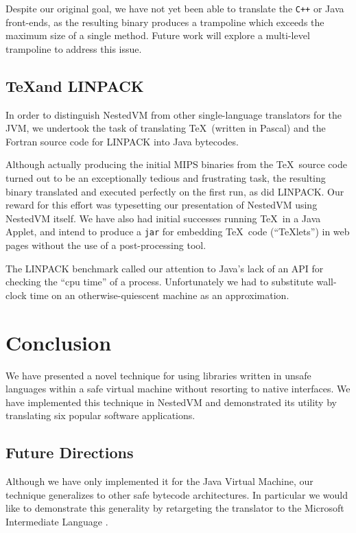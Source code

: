 \documentclass{acmconf}
\begin{document}
Despite our original goal, we have not yet been able to translate the
{\tt C++} or Java front-ends, as the resulting binary produces a
trampoline which exceeds the maximum size of a single method.  Future
work will explore a multi-level trampoline to address this issue.


\subsection{\TeX and LINPACK}

In order to distinguish NestedVM from other single-language
translators for the JVM, we undertook the task of translating \TeX\
(written in Pascal) and the Fortran source code for LINPACK into Java
bytecodes.

Although actually producing the initial MIPS binaries from the \TeX\
source code turned out to be an exceptionally tedious and frustrating
task, the resulting binary translated and executed perfectly on the
first run, as did LINPACK.  Our reward for this effort was typesetting
our presentation of NestedVM using NestedVM itself.  We have also had
initial successes running \TeX\ in a Java Applet, and intend to
produce a {\tt jar} for embedding \TeX\ code (``\TeX lets'') in web
pages without the use of a post-processing tool.

The LINPACK benchmark called our attention to Java's lack of an API
for checking the ``cpu time'' of a process.  Unfortunately we had to
substitute wall-clock time on an otherwise-quiescent machine as an
approximation.


\section{Conclusion}

We have presented a novel technique for using libraries written in
unsafe languages within a safe virtual machine without resorting to
native interfaces.  We have implemented this technique in NestedVM and
demonstrated its utility by translating six popular software
applications.

\subsection{Future Directions}

Although we have only implemented it for the Java Virtual Machine, our
technique generalizes to other safe bytecode architectures.  In
particular we would like to demonstrate this generality by retargeting
the translator to the Microsoft Intermediate Language \cite{msil}.
\end{document}
